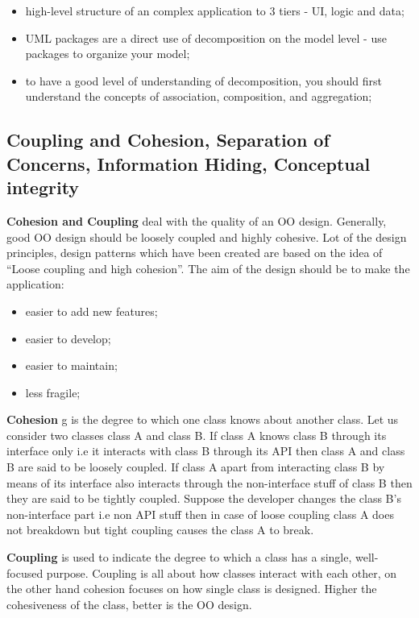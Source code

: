 \documentclass{article}
\begin{document}
\begin{enumerate}
\begin{itemize}
						\item  high-level structure of an complex application to 3 tiers - UI, logic and data;

						\item UML packages are a direct use of decomposition on the model level - use packages to organize your model;

						\item to have a good level of understanding of decomposition, you should first understand the concepts of association, composition, and aggregation;
					\end{itemize}
			\end{enumerate}

		\subsection{Coupling and Cohesion, Separation of Concerns, Information Hiding, Conceptual integrity}

			\textbf{Cohesion and Coupling} deal with the quality of an OO design. Generally, good OO design should be loosely coupled and highly cohesive. Lot of the design principles, design patterns which have been created are based on the idea of “Loose coupling and high cohesion”. The aim of the design should be to make the application:
			\begin{itemize}
				\item easier to add new features;
				\item easier to develop;
				\item easier to maintain;
				\item less fragile;
			\end{itemize}

			\bigskip
			\textbf{Cohesion} g is the degree to which one class knows about another class. Let us consider two classes class A and class B. If class A knows class B through its interface only i.e it interacts with class B through its API then class A and class B are said to be loosely coupled. If class A apart from interacting class B by means of its interface also interacts through the non-interface stuff of class B then they are said to be tightly coupled. Suppose the developer changes the class B’s non-interface part i.e non API stuff then in case of loose coupling class A does not breakdown but tight coupling causes the class A to break.
				
			\bigskip
			\textbf{Coupling} is used to indicate the degree to which a class has a single, well-focused purpose. Coupling is all about how classes interact with each other, on the other hand cohesion focuses on how single class is designed. Higher the cohesiveness of the class, better is the OO design.
\end{document}
